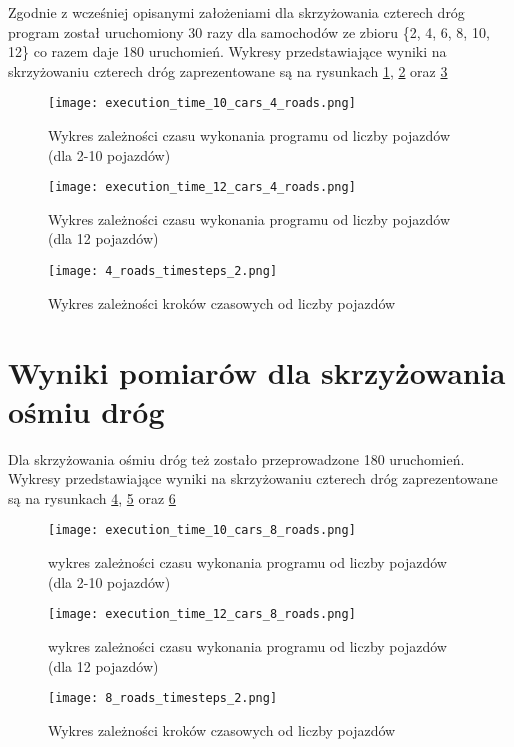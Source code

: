Zgodnie z wcześniej opisanymi założeniami dla skrzyżowania czterech dróg program został uruchomiony 30 razy dla samochodów ze zbioru \{2, 4, 6, 8, 10, 12\} co razem daje 180 uruchomień.
\newline
\newline
Wykresy przedstawiające wyniki na skrzyżowaniu czterech dróg zaprezentowane są na rysunkach \ref{execution_time_10_cars_4_roads}, \ref{execution_time_12_cars_4_roads} oraz \ref{four-roads-crossroads-timesteps}
\begin{figure}[H]
  \texttt{[image: execution\_time\_10\_cars\_4\_roads.png]}
  \caption{Wykres zależności czasu wykonania programu od liczby pojazdów (dla 2-10 pojazdów)}
  \label{execution_time_10_cars_4_roads}
\end{figure}
\begin{figure}[H]
  \texttt{[image: execution\_time\_12\_cars\_4\_roads.png]}
  \caption{Wykres zależności czasu wykonania programu od liczby pojazdów (dla 12 pojazdów)}
  \label{execution_time_12_cars_4_roads}
\end{figure}
\begin{figure}[H]
  \texttt{[image: 4\_roads\_timesteps\_2.png]}
  \caption{Wykres zależności kroków czasowych od liczby pojazdów}
  \label{four-roads-crossroads-timesteps}
\end{figure}

\section{Wyniki pomiarów dla skrzyżowania ośmiu dróg}

Dla skrzyżowania ośmiu dróg też zostało przeprowadzone 180 uruchomień.
\newline
\newline
Wykresy przedstawiające wyniki na skrzyżowaniu czterech dróg zaprezentowane są na rysunkach \ref{execution_time_10_cars_8_roads}, \ref{execution_time_12_cars_8_roads} oraz \ref{eight-roads-crossroads-timesteps}
\begin{figure}[H]
    \texttt{[image: execution\_time\_10\_cars\_8\_roads.png]}
  \caption{wykres zależności czasu wykonania programu od liczby pojazdów (dla 2-10 pojazdów)}
  \label{execution_time_10_cars_8_roads}
\end{figure}
\begin{figure}[H]
    \texttt{[image: execution\_time\_12\_cars\_8\_roads.png]}
  \caption{wykres zależności czasu wykonania programu od liczby pojazdów (dla 12 pojazdów)}
  \label{execution_time_12_cars_8_roads}
\end{figure}
\begin{figure}[H]
    \texttt{[image: 8\_roads\_timesteps\_2.png]}
  \caption{Wykres zależności kroków czasowych od liczby pojazdów}
  \label{eight-roads-crossroads-timesteps}
\end{figure}

